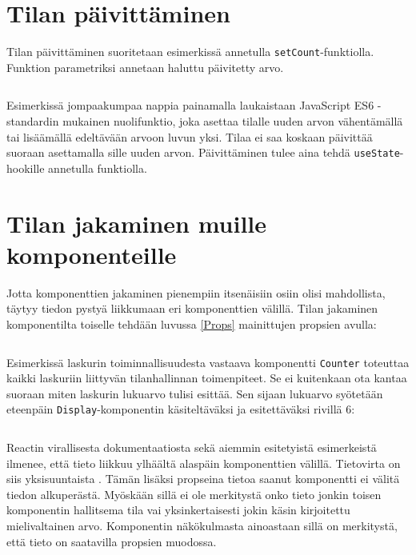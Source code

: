 
\section{Tilan päivittäminen}
\label{Tilan päivittäminen}

Tilan päivittäminen suoritetaan esimerkissä annetulla \texttt{setCount}-funktiolla. Funktion parametriksi annetaan haluttu päivitetty arvo.
\inputminted[bgcolor=black,highlightlines={5,7},highlightcolor=darkgray]{jsx.py:JsxLexer -x}{listaukset/counter2.js}
Esimerkissä jompaakumpaa nappia painamalla laukaistaan JavaScript ES6 -standardin mukainen nuolifunktio, joka asettaa tilalle uuden arvon vähentämällä tai lisäämällä edeltävään arvoon luvun yksi. Tilaa ei saa koskaan päivittää suoraan asettamalla sille uuden arvon. Päivittäminen tulee aina tehdä \texttt{useState}-hookille annetulla funktiolla. \cite{reactdocsstate}


\section{Tilan jakaminen muille komponenteille}
\label{Tilan jakaminen muille komponenteille}

Jotta komponenttien jakaminen pienempiin itsenäisiin osiin olisi mahdollista, täytyy tiedon pystyä liikkumaan eri komponenttien välillä. Tilan jakaminen komponentilta toiselle tehdään luvussa \ref{Props} mainittujen propsien avulla:
\inputminted[bgcolor=black,highlightlines={6},highlightcolor=darkgray]{jsx.py:JsxLexer -x}{listaukset/counter3.js}
Esimerkissä laskurin toiminnallisuudesta vastaava komponentti \texttt{Counter} toteuttaa kaikki laskuriin liittyvän tilanhallinnan toimenpiteet. Se ei kuitenkaan ota kantaa suoraan miten laskurin lukuarvo tulisi esittää. Sen sijaan lukuarvo syötetään eteenpäin \texttt{Display}-komponentin käsiteltäväksi ja esitettäväksi rivillä 6:
\inputminted[bgcolor=black]{jsx.py:JsxLexer -x}{listaukset/display.js}

Reactin virallisesta dokumentaatiosta sekä aiemmin esitetyistä esimerkeistä ilmenee, että tieto liikkuu ylhäältä alaspäin komponenttien välillä. Tietovirta on siis yksisuuntaista \cite{reactdocsstate}. Tämän lisäksi propseina tietoa saanut komponentti ei välitä tiedon alkuperästä. Myöskään sillä ei ole merkitystä onko tieto jonkin toisen komponentin hallitsema tila vai yksinkertaisesti jokin käsin kirjoitettu mielivaltainen arvo. Komponentin näkökulmasta ainoastaan sillä on merkitystä, että tieto on saatavilla propsien muodossa.